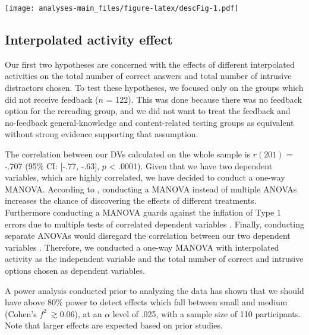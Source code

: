 \texttt{[image: analyses-main\_files/figure-latex/descFig-1.pdf]}

\hypertarget{interpolated-activity-effect}{%
\subsection{Interpolated activity
effect}\label{interpolated-activity-effect}}

Our first two hypotheses are concerned with the effects of different
interpolated activities on the total number of correct answers and total
number of intrusive distractors chosen. To test these hypotheses, we
focused only on the groups which did not receive feedback (\(n\) = 122).
This was done because there was no feedback option for the rereading
group, and we did not want to treat the feedback and no-feedback
general-knowledge and content-related testing groups as equivalent
without strong evidence supporting that assumption.

The correlation between our DVs calculated on the whole sample is
\(r(201) =\) -.707 (95\% CI: {[}-.77, -.63{]}, \(p\) \textless{} .0001).
Given that we have two dependent variables, which are highly correlated,
we have decided to conduct a one-way MANOVA. According to
\citet{tabachnickUsingMultivariateStatistics2012}, conducting a MANOVA
instead of multiple ANOVAs increases the chance of discovering the
effects of different treatments. Furthermore conducting a MANOVA guards
against the inflation of Type 1 errors due to multiple tests of
correlated dependent variables
\citep{tabachnickUsingMultivariateStatistics2012,fieldDiscoveringStatisticsUsing2012}.
Finally, conducting separate ANOVAs would disregard the correlation
between our two dependent variables
\citep{fieldDiscoveringStatisticsUsing2012}. Therefore, we conducted a
one-way MANOVA with interpolated activity as the independent variable
and the total number of correct and intrusive options chosen as
dependent variables.

A power analysis conducted prior to analyzing the data
\citep[using the G*Power software by][]{faulStatisticalPowerAnalyses2009}
has shown that we should have above 80\% power to detect effects which
fall between small and medium (Cohen's \(f^2\ \gtrsim 0.06\)), at an
\(\alpha\) level of .025, with a sample size of 110 participants. Note
that larger effects are expected based on prior studies.

